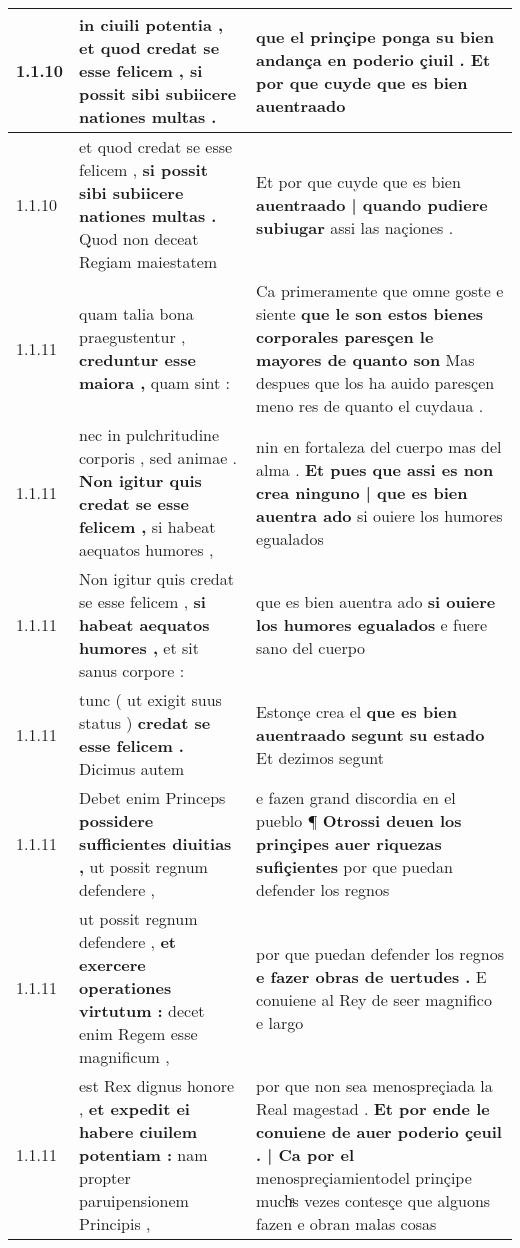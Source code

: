 \begin{tabular}{|p{1cm}|p{6.5cm}|p{6.5cm}|}
1.1.10 & in ciuili potentia , \textbf{ et quod credat se esse felicem , } si possit sibi subiicere nationes multas . & que el prinçipe ponga su bien andança en poderio çiuil . \textbf{ Et por que cuyde que es bien } auentraado \\\hline
1.1.10 & et quod credat se esse felicem , \textbf{ si possit sibi subiicere nationes multas . } Quod non deceat Regiam maiestatem & Et por que cuyde que es bien \textbf{ auentraado | quando pudiere subiugar } assi las naçiones . \\\hline
1.1.11 & quam talia bona praegustentur , \textbf{ creduntur esse maiora , } quam sint : & Ca primeramente que omne goste e siente \textbf{ que le son estos bienes corporales paresçen le mayores de quanto son } Mas despues que los ha auido paresçen meno res de quanto el cuydaua . \\\hline
1.1.11 & nec in pulchritudine corporis , sed animae . \textbf{ Non igitur quis credat se esse felicem , } si habeat aequatos humores , & nin en fortaleza del cuerpo mas del alma . \textbf{ Et pues que assi es non crea ninguno | que es bien auentra ado } si ouiere los humores egualados \\\hline
1.1.11 & Non igitur quis credat se esse felicem , \textbf{ si habeat aequatos humores , } et sit sanus corpore : & que es bien auentra ado \textbf{ si ouiere los humores egualados } e fuere sano del cuerpo \\\hline
1.1.11 & tunc ( ut exigit suus status ) \textbf{ credat se esse felicem . } Dicimus autem & Estonçe crea el \textbf{ que es bien auentraado segunt su estado } Et dezimos segunt \\\hline
1.1.11 & Debet enim Princeps \textbf{ possidere sufficientes diuitias , } ut possit regnum defendere , & e fazen grand discordia en el pueblo ¶ \textbf{ Otrossi deuen los prinçipes auer riquezas sufiçientes } por que puedan defender los regnos \\\hline
1.1.11 & ut possit regnum defendere , \textbf{ et exercere operationes virtutum : } decet enim Regem esse magnificum , & por que puedan defender los regnos \textbf{ e fazer obras de uertudes . } E conuiene al Rey de seer magnifico e largo \\\hline
1.1.11 & est Rex dignus honore , \textbf{ et expedit ei habere ciuilem potentiam : } nam propter paruipensionem Principis , & por que non sea menospreçiada la Real magestad . \textbf{ Et por ende le conuiene de auer poderio çeuil . | Ca por el } menospreçiamientodel prinçipe muchͣs vezes contesçe que alguons fazen e obran malas cosas \\\hline

\end{tabular}
